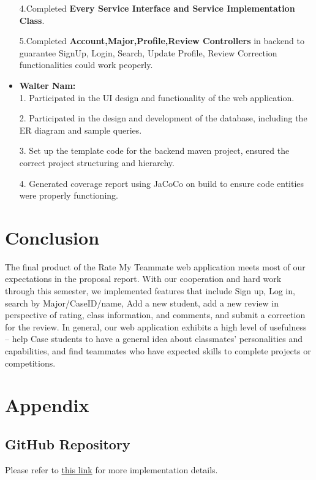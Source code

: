 \documentclass[12pt]{article}
\begin{document}
\begin{itemize}
	4.Completed \textbf {Every Service Interface and Service Implementation Class}.

	5.Completed \textbf {Account,Major,Profile,Review Controllers} in backend to guarantee SignUp, Login, Search, Update Profile, Review Correction functionalities could work peoperly.
    \item \textbf{Walter Nam: }
    \\1. Participated in the UI design and functionality of the web application.
    
      2. Participated in the design and development of the database, including the ER diagram and sample queries. 
    
      3. Set up the template code for the backend maven project, ensured the correct project structuring and hierarchy.
    
      4. Generated coverage report using JaCoCo on build to ensure code entities were properly functioning. 
\end{itemize}

\section{Conclusion}
The final product of the Rate My Teammate web application meets most of our expectations in the proposal report. With our cooperation and hard work through this semester, we implemented features that include Sign up, Log in, search by Major/CaseID/name, Add a new student, add a new review in perspective of rating, class information, and comments, and submit a correction for the review. In general, our web application exhibits a high level of usefulness -- help Case students to have a general idea about classmates' personalities and capabilities, and find teammates who have expected skills to complete projects or competitions.

\section{Appendix}
\subsection{GitHub Repository}
\label{repo}
Please refer to \href{https://github.com/jyyy03/CSDS395_Rate_My_Teammate}{this link} for more implementation details.
\end{document}
